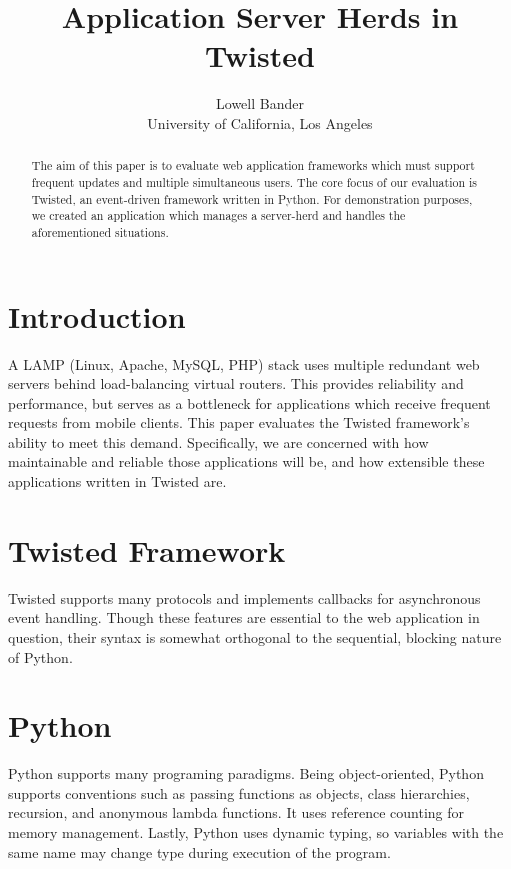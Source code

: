 \documentclass[letterpaper,twocolumn,10pt]{article}
\begin{document}
\date{}

\title{\Large \bf Application Server Herds in Twisted}

\author{
{\rm Lowell Bander} \\
University of California, Los Angeles
}

\maketitle

\begin{abstract}
The aim of this paper is to evaluate web application frameworks which must support frequent updates and multiple simultaneous users. The core focus of our evaluation is Twisted, an event-driven framework written in Python. For demonstration purposes, we created an application which manages a server-herd and handles the aforementioned situations.
\end{abstract}

\section{Introduction}
A LAMP (Linux, Apache, MySQL, PHP) stack uses multiple redundant web servers behind load-balancing virtual routers. This provides reliability and performance, but serves as a bottleneck for applications which receive frequent requests from mobile clients. This paper evaluates the Twisted framework's ability to meet this demand. Specifically, we are concerned with how maintainable and reliable those applications will be, and how extensible these applications written in Twisted are.

\section{Twisted Framework}
Twisted supports many protocols and implements callbacks for asynchronous event handling. Though these features are essential to the web application in question, their syntax is somewhat orthogonal to the sequential, blocking nature of Python.

\section{Python}
Python supports many programing paradigms. Being object-oriented, Python supports conventions such as passing functions as objects, class hierarchies, recursion, and anonymous lambda functions. It uses reference counting for memory management. Lastly, Python uses dynamic typing, so variables with the same name may change type during execution of the program.
\end{document}
